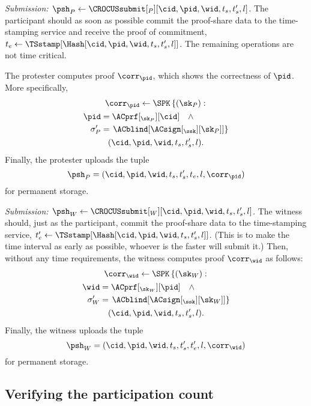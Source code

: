 \emph{Submission: \(\psh_P\gets \CROCUSsubmit[_P][\cid, \pid, \wid, t_s, t_s',  l]\).}
The participant should as soon as possible commit the proof-share data to the 
time-stamping service and receive the proof of commitment, \(t_e\gets 
  \TSstamp[\Hash[\cid, \pid, \wid, t_s, t_s', l]]\).
The remaining operations are not time critical.

The protester computes  proof \(\corr_{\pid}\), which shows the 
correctness of \(\pid\).
More specifically,
\begin{multline*}
  \corr_{\pid}\gets \SPK\left\{ (\sk_P) : \right. \\
    \begin{aligned}
      \pid &= \ACprf[_{\sk_P}][\cid] \quad \land \\
      \sigma_P' &= \left. \ACblind[\ACsign[_{\ssk}][\sk_P]] \right\}
    \end{aligned} \\
      (\cid, \pid, \wid, t_s, t_s', l).
\end{multline*}
Finally, the protester uploads the tuple \[
  \psh_P = (\cid, \pid, \wid, t_s, t_s', t_e, l, \corr_{\pid})
\] for permanent storage.

\emph{Submission: \(\psh_W\gets \CROCUSsubmit[_W][\cid, \pid, \wid, t_s, t_s', 
    l]\).}
The witness should, just as the participant, commit the proof-share data to the 
time-stamping service, \(t_e'\gets \TSstamp[\Hash[\cid, \pid, \wid, t_s, t_s', 
  l]]\).
(This is to make the time interval as early as possible, whoever is the faster 
will submit it.)
Then, without any time requirements, the witness computes  proof 
\(\corr_{\wid}\) as follows:
\begin{multline*}
  \corr_{\wid}\gets \SPK\left\{ (\sk_W) : \right. \\
    \begin{aligned}
      \wid &= \ACprf[_{\sk_W}][\pid] \quad \land \\
      \sigma_W' &= \left. \ACblind[\ACsign[_{\ssk}][\sk_W]] \right\}
    \end{aligned} \\
      (\cid, \pid, \wid, t_s, t_s', l).
\end{multline*}
Finally, the witness uploads the tuple \[
  \psh_W = (\cid, \pid, \wid, t_s, t_s', t_e', l, \corr_{\wid})
\] for permanent storage.

\subsection{Verifying the participation count}%
\label{ProtocolVerification}

